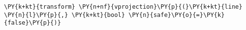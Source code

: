 \begin{Verbatim}[commandchars=\\\{\}]
    \PY{k+kt}{transform} \PY{n+nf}{vprojection}\PY{p}{(}\PY{k+kt}{line} \PY{n}{l}\PY{p}{,} \PY{k+kt}{bool} \PY{n}{safe}\PY{o}{=}\PY{k}{false}\PY{p}{)}
\end{Verbatim}
